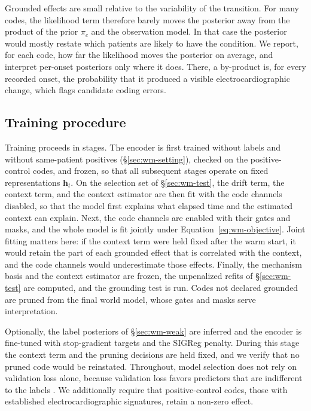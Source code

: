 Grounded effects are small relative to the variability of the transition. For many codes, the likelihood term therefore barely moves the posterior away from the product of the prior $\pi_c$ and the observation model. In that case the posterior would mostly restate which patients are likely to have the condition. We report, for each code, how far the likelihood moves the posterior on average, and interpret per-onset posteriors only where it does. There, a by-product is, for every recorded onset, the probability that it produced a visible electrocardiographic change, which flags candidate coding errors.

\subsection{Training procedure}
\label{sec:wm-training}

Training proceeds in stages. The encoder is first trained without labels and without same-patient positives (\S\ref{sec:wm-setting}), checked on the positive-control codes, and frozen, so that all subsequent stages operate on fixed representations $\mathbf{h}_t$. On the selection set of \S\ref{sec:wm-test}, the drift term, the context term, and the context estimator are then fit with the code channels disabled, so that the model first explains what elapsed time and the estimated context can explain. Next, the code channels are enabled with their gates and masks, and the whole model is fit jointly under Equation~\eqref{eq:wm-objective}. Joint fitting matters here: if the context term were held fixed after the warm start, it would retain the part of each grounded effect that is correlated with the context, and the code channels would underestimate those effects. Finally, the mechanism basis and the context estimator are frozen, the unpenalized refits of \S\ref{sec:wm-test} are computed, and the grounding test is run. Codes not declared grounded are pruned from the final world model, whose gates and masks serve interpretation.

Optionally, the label posteriors of \S\ref{sec:wm-weak} are inferred and the encoder is fine-tuned with stop-gradient targets and the SIGReg penalty. During this stage the context term and the pruning decisions are held fixed, and we verify that no pruned code would be reinstated. Throughout, model selection does not rely on validation loss alone, because validation loss favors predictors that are indifferent to the labels \citep{li2026dueling}. We additionally require that positive-control codes, those with established electrocardiographic signatures, retain a non-zero effect.

